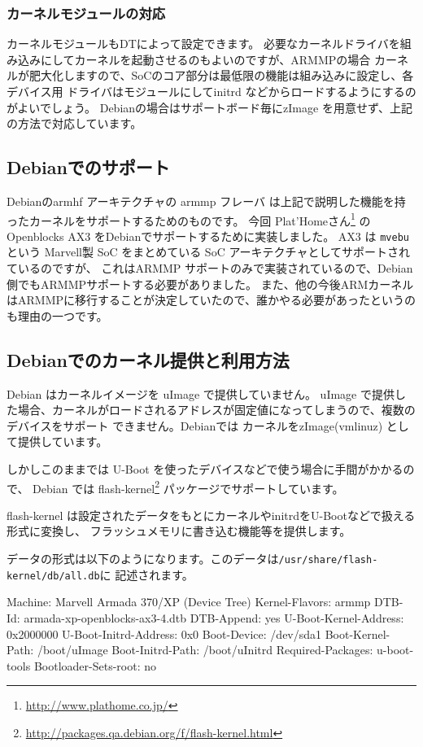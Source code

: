 \documentclass[mingoth,a4paper]{jsarticle}
\begin{document}
\subsubsection{カーネルモジュールの対応}

カーネルモジュールもDTによって設定できます。
必要なカーネルドライバを組み込みにしてカーネルを起動させるのもよいのですが、ARMMPの場合
カーネルが肥大化しますので、SoCのコア部分は最低限の機能は組み込みに設定し、各デバイス用
ドライバはモジュールにしてinitrd などからロードするようにするのがよいでしょう。
Debianの場合はサポートボード毎にzImage を用意せず、上記の方法で対応しています。

\subsection{Debianでのサポート}

Debianのarmhf アーキテクチャの armmp フレーバ は上記で説明した機能を持ったカーネルをサポートするためのものです。
今回 Plat'Homeさん\footnote{\url{http://www.plathome.co.jp/}}
の Openblocks AX3 をDebianでサポートするために実装しました。
AX3 は \texttt{mvebu} という Marvell製 SoC をまとめている SoC アーキテクチャとしてサポートされているのですが、
これはARMMP サポートのみで実装されているので、Debian側でもARMMPサポートする必要がありました。
また、他の今後ARMカーネルはARMMPに移行することが決定していたので、誰かやる必要があったというのも理由の一つです。

\subsection{Debianでのカーネル提供と利用方法}
Debian はカーネルイメージを uImage で提供していません。
uImage で提供した場合、カーネルがロードされるアドレスが固定値になってしまうので、複数のデバイスをサポート
できません。Debianでは カーネルをzImage(vmlinuz) として提供しています。

しかしこのままでは U-Boot を使ったデバイスなどで使う場合に手間がかかるので、
Debian では flash-kernel\footnote{\url{http://packages.qa.debian.org/f/flash-kernel.html}} 
パッケージでサポートしています。

flash-kernel は設定されたデータをもとにカーネルやinitrdをU-Bootなどで扱える形式に変換し、
フラッシュメモリに書き込む機能等を提供します。

データの形式は以下のようになります。このデータは\texttt{/usr/share/flash-kernel/db/all.db}に
記述されます。

\begin{commandline}
Machine: Marvell Armada 370/XP (Device Tree)
Kernel-Flavors: armmp
DTB-Id: armada-xp-openblocks-ax3-4.dtb
DTB-Append: yes 
U-Boot-Kernel-Address: 0x2000000
U-Boot-Initrd-Address: 0x0
Boot-Device: /dev/sda1
Boot-Kernel-Path: /boot/uImage
Boot-Initrd-Path: /boot/uInitrd
Required-Packages: u-boot-tools
Bootloader-Sets-root: no
\end{commandline}
\end{document}

